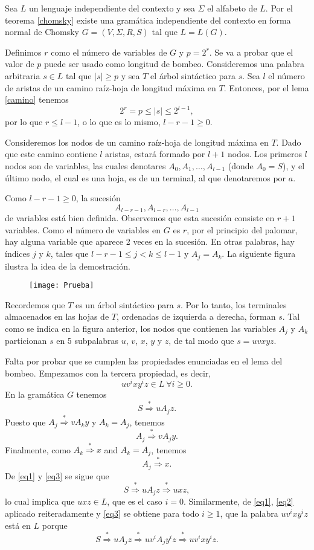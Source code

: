 \documentclass[twoside]{article}
\newcommand{\derive}{\overset{*}{\Rightarrow}}
\begin{document}
\begin{dem}
Sea $L$ un lenguaje independiente del contexto y sea $\Sigma$ el alfabeto de $L$. Por el teorema \ref{chomsky} existe una gramática independiente del contexto en forma normal de Chomsky $G=(V,\Sigma,R,S)$ tal que $L=L(G)$.

Definimos $r$ como el número de variables de $G$ y $p=2^r$. Se va a probar que el valor de $p$ puede ser usado como longitud de bombeo. Consideremos una palabra arbitraria $s\in L$ tal que $|s|\geq p$ y sea $T$ el árbol sintáctico para $s$. Sea $l$ el número de aristas de un camino raíz-hoja de longitud máxima en $T$. Entonces, por el lema \ref{camino} tenemos
$$2^r=p\leq |s|\leq 2^{l-1},$$
por lo que $r\leq l-1$, o lo que es lo mismo, $l-r-1\geq 0$. 

Consideremos los nodos de un camino raíz-hoja de longitud máxima en $T$. Dado que este camino contiene $l$ aristas, estará formado por $l+1$ nodos. Los primeros $l$ nodos son de variables, las cuales denotares $A_0,A_1,\dots, A_{l-1}$ (donde $A_0=S$), y el último nodo, el cual es una hoja, es de un terminal, al que denotaremos por $a$. 

Como  $l-r-1\geq 0$, la sucesión $$A_{l-r-1}, A_{l-r},\dots, A_{l-1}$$
de variables está bien definida. Observemos que esta sucesión consiste en $r+1$ variables. Como el número de variables en $G$ es $r$, por el principio del palomar, hay alguna variable que aparece 2 veces en la sucesión. En otras palabras, hay índices $j$ y $k$, tales que $l-r-1\leq j<k\leq l-1$ y $A_j=A_k$. La siguiente figura ilustra la idea de la demostración.

\begin{figure}[h!]
\texttt{[image: Prueba]}
\end{figure}

Recordemos que $T$ es un árbol sintáctico para $s$. Por lo tanto, los terminales almacenados en las hojas de $T$, ordenadas de izquierda a derecha, forman $s$. Tal como se indica en la figura anterior, los nodos que contienen las variables $A_j$ y $A_k$ particionan $s$ en 5 subpalabras $u$, $v$, $x$, $y$ y $z$, de tal modo que $s=uvxyz$.

Falta por probar que se cumplen las propiedades enunciadas en el lema del bombeo. Empezamos con la tercera propiedad, es decir, 
$$uv^ixy^iz\in L\ \forall i\geq 0.$$
En la gramática $G$ tenemos 
\begin{equation}\label{eq1}
S\overset{*}{\Rightarrow}uA_jz.
\end{equation}
Puesto que $A_j\overset{*}{\Rightarrow} vA_ky$ y $A_k=A_j$, tenemos
\begin{equation}\label{eq2}
A_j\derive vA_jy.
\end{equation}
Finalmente, como $A_k\derive x$ and $A_k=A_j$, tenemos
\begin{equation}\label{eq3}
A_j\derive x.
\end{equation}
De \ref{eq1} y \ref{eq3} se sigue que 
$$S\derive uA_jz\derive uxz,$$
lo cual implica que $uxz\in L$, que es el caso $i=0$. Similarmente, de \ref{eq1}, \ref{eq2} aplicado reiteradamente y \ref{eq3} se obtiene para todo $i\geq 1$, que la palabra $uv^ixy^iz$ está en $L$ porque
$$S\derive uA_jz\derive uv^iA_jy^iz\derive uv^ixy^iz.$$


\end{dem}
\end{document}
